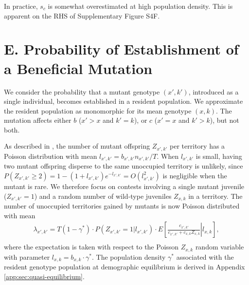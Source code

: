 \documentclass[9pt,twocolumn,twoside,lineno]{gsajnl}
\begin{document}
In practice, $s_c$ is somewhat overestimated at high population density. This is apparent on the RHS of Supplementary Figure S4F.

\section{E. Probability of Establishment of a Beneficial Mutation}
\label{app:pFixCalculation}

We consider the probability that a mutant genotype $(x',k')$, introduced as a single individual, becomes established in a resident population. We approximate the resident population as monomorphic for its mean genotype $(x,k)$. The mutation affects either $b$ ($x'>x$ and $k'=k$), or $c$ ($x'=x$ and $k'>k$), but not both.

As described in \cite{bertram2019density}, the number of mutant offspring $Z_{x',k'}$ per territory has a Poisson distribution with mean $l_{x',k'}=b_{x',k'}n_{x',k'}/T$. When $l_{x',k'}$ is small, having two mutant offspring disperse to the same unoccupied territory is unlikely, since $P( Z_{x',k'} \geq 2)=1-(1+l_{x',k'})e^{-l_{x',k'}}=O(l_{x',k'}^2)$ is negligible when the mutant is rare. We therefore focus on contests involving a single mutant juvenile ($Z_{x',k'}=1$) and a random number of wild-type juveniles $Z_{x,k}$ in a territory. The number of unoccupied territories gained by mutants is now Poisson distributed with mean
\begin{equation}\label{app:eq:pFixCompetitionRate}
\begin{aligned}
\lambda_{x',k'}=T(1-\gamma^*)\cdot P(Z_{x',k'}=1|l_{x',k'}) \cdot E \left[ \left.  \frac{c_{x',k'}}{c_{x',k'}+c_{x,k}Z_{x,k}} \right| l_{x,k}\right],\\
\end{aligned}
\end{equation}
where the expectation is taken with respect to the Poisson $Z_{x,k}$ random variable with parameter $l_{x,k}=b_{x,k}\cdot\gamma^*$. The population density $\gamma^*$ associated with the resident genotype population at demographic equilibrium is derived in Appendix \ref{app:sec:quasi-equilibrium}. \\
\end{document}
